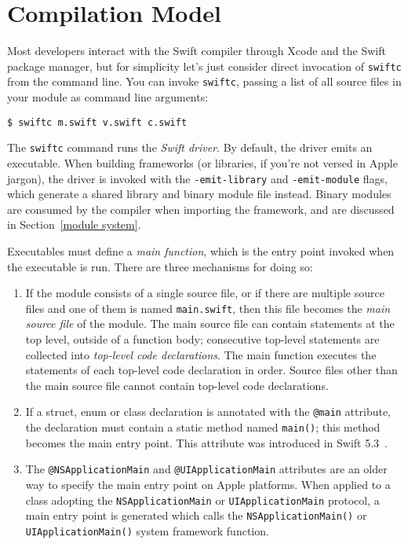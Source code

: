 \documentclass[a4paper,headsepline,bibliography=totoc,toc=flat,fleqn,twoside=semi]{scrbook}
\theoremstyle{definition}
\theoremstyle{definition}
\theoremstyle{definition}
\begin{document}
\chapter{Compilation Model}\label{compilation model}

Most developers interact with the Swift compiler through Xcode and the Swift package manager, but for simplicity let's just consider direct invocation of \texttt{swiftc} from the command line. You can invoke \texttt{swiftc}, passing a list of all source files in your module as command line arguments:
\begin{Verbatim}
$ swiftc m.swift v.swift c.swift
\end{Verbatim}
The \texttt{swiftc} command runs the \emph{Swift driver}. By default, the driver emits an executable. When building frameworks (or libraries, if you're not versed in Apple jargon), the driver is invoked with the \texttt{-emit-library} and \texttt{-emit-module} flags, which generate a shared library and binary module file instead. Binary modules are consumed by the compiler when importing the framework, and are discussed in Section~\ref{module system}.

Executables must define a \emph{main function}, which is the entry point invoked when the executable is run. There are three mechanisms for doing so:
\begin{enumerate}
\item If the module consists of a single source file, or if there are multiple source files and one of them is named \texttt{main.swift}, then this file becomes the \emph{main source file} of the module. The main source file can contain statements at the top level, outside of a function body; consecutive top-level statements are collected into \emph{top-level code declarations}. The main function executes the statements of each top-level code declaration in order. Source files other than the main source file cannot contain top-level code declarations.
\item If a struct, enum or class declaration is annotated with the \texttt{@main} attribute, the declaration must contain a static method named \texttt{main()}; this method becomes the main entry point. This attribute was introduced in Swift 5.3~\cite{se0281}.
\item The \texttt{@NSApplicationMain} and \texttt{@UIApplicationMain} attributes are an older way to specify the main entry point on Apple platforms. When applied to a class adopting the \texttt{NSApplicationMain} or \texttt{UIApplicationMain} protocol, a main entry point is generated which calls the \texttt{NSApplicationMain()} or \texttt{UIApplicationMain()} system framework function.
\end{enumerate}
\end{document}

